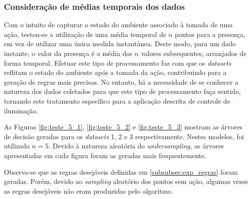 \clearpage

\subsubsection{Consideração de médias temporais dos dados} \label{subsubsec:presence_mean}
Com o intuito de capturar o estado do ambiente associado à tomada de uma ação, testou-se a utilização de uma média temporal de $n$ pontos para a presença, em vez de utilizar uma única medida instantânea. Deste modo, para um dado instante, o valor da presença é a média dos $n$ valores subsequentes, arranjados de forma temporal. Efetuar este tipo de processamento faz com que os \textit{datasets} reflitam o estado do ambiente após a tomada da ação, contribuindo para a geração de regras mais precisas. No entanto, há a necessidade de se conhecer a natureza dos dados coletados para que este tipo de processamento faça sentido, tornando este tratamento específico para a aplicação descrita de controle de iluminação.

As Figuras \ref{fig:teste_5_1}, \ref{fig:teste_5_2} e \ref{fig:teste_5_3} mostram as árvores de decisão geradas para os \textit{datasets} 1, 2 e 3 respectivamente. Nestes modelos, foi utilizado $n=5$. Devido à natureza aleatória do \textit{undersampling}, as árvores apresentadas em cada figura foram as geradas mais frequentemente.

Observa-se que as regras desejáveis definidas em \ref{subsubsec:exp_regras} foram geradas. Porém, devido ao \textit{sampling} aleatório dos pontos sem ação, algumas vezes as regras desejáveis não eram produzidas pelo algoritmo.

